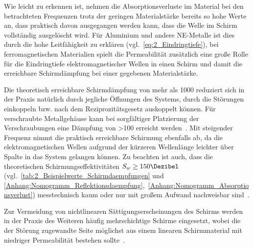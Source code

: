 Wie leicht zu erkennen ist, nehmen die Absorptionsverluste im Material bei den betrachteten Frequenzen trotz der geringen Materialstärke bereits so hohe Werte an, dass praktisch davon ausgegangen werden kann, dass die Welle im Schirm vollständig ausgelöscht wird. Für Aluminium und andere \ac{NE-Metalle} ist dies durch die hohe Leitfähigkeit zu erklären (vgl.~\Gleichung\eqref{eq:2_Eindringtiefe}), bei ferromagnetischen Materialien spielt die Permeabilität zusätzlich eine große Rolle für die Eindringtiefe elektromagnetischer Wellen in einen Schirm und damit die erreichbare Schirmdämpfung bei einer gegebenen Materialstärke. 
\par
\vspace{\linespace}
Die theoretisch erreichbare Schirmdämpfung von mehr als \SI{1000}{\Dezibel} reduziert sich in der Praxis natürlich durch jegliche Öffnungen des Systems, durch die Störungen einkoppeln bzw. nach dem Reziprozitätsgesetz auskoppelt können. Für verschraubte Metallgehäuse kann bei sorgfältiger Platzierung der Verschraubungen eine Dämpfung von >\SI{100}{\Dezibel} erreicht werden~\cite{Design_of_shielded_enclosures}. Mit steigender Frequenz nimmt die praktisch erreichbare Schirmung ebenfalls ab, da die elektromagnetischen Wellen aufgrund der kürzeren Wellenlänge leichter über Spalte in das System gelangen können. Zu beachten ist auch, dass die theoretischen Schirmungseffektivitäten $S_w \geq 150 \si{\Dezibel}$ (vgl.~\Tabelle\ref{tab:2_Beispielwerte_Schirmdaempfungen} und \Anhang\ref{Anhang:Nomogramm_Reflektionsdaempfung},~\ref{Anhang:Nomogramm_Absorptionsverlust}) messtechnisch kaum oder nur mit großem Aufwand nachweisbar sind~\cite{EM_Schirmung}.
\par
\vspace{\linespace}
Zur Vermeidung von nichtlinearen Sättigungserscheinungen des Schirms werden in der Praxis des Weiteren häufig mehrschichtige Schirme eingesetzt, wobei die der Störung zugewandte Seite möglichst aus einem linearen Schirmmaterial mit niedriger Permeabilität bestehen sollte~\cite{EMV}. 



